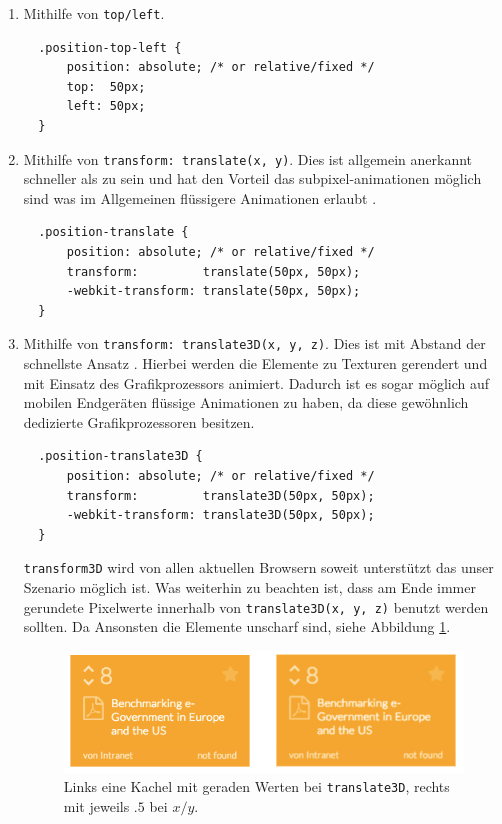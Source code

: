 \documentclass[12pt,twoside]{book}
\begin{document}
\begin{enumerate}
  \item Mithilfe von \texttt{top/left}.\\
  \begin{verbatim}
  .position-top-left {
      position: absolute; /* or relative/fixed */
      top:  50px;
      left: 50px;
  }
  \end{verbatim}
  \item Mithilfe von \texttt{transform: translate(x, y)}. Dies ist allgemein anerkannt schneller als zu sein und hat den Vorteil das subpixel-animationen möglich sind was im Allgemeinen flüssigere Animationen erlaubt \cite{translate}. \\
  \begin{verbatim}
  .position-translate {
      position: absolute; /* or relative/fixed */
      transform:         translate(50px, 50px);
      -webkit-transform: translate(50px, 50px);
  }
  \end{verbatim}
  \item Mithilfe von \texttt{transform: translate3D(x, y, z)}. Dies ist mit Abstand der schnellste Ansatz \cite{translate3dvstranslate}. Hierbei werden die Elemente zu Texturen gerendert und mit Einsatz des Grafikprozessors animiert. Dadurch ist es sogar möglich auf mobilen Endgeräten flüssige Animationen zu haben, da diese gewöhnlich dedizierte Grafikprozessoren besitzen.
  \begin{verbatim}
  .position-translate3D {
      position: absolute; /* or relative/fixed */
      transform:         translate3D(50px, 50px);
      -webkit-transform: translate3D(50px, 50px);
  }
  \end{verbatim}
  \texttt{transform3D} wird von allen aktuellen Browsern soweit unterstützt das unser Szenario möglich ist\cite{transform3d}. Was weiterhin zu beachten ist, dass am Ende immer gerundete Pixelwerte innerhalb von \texttt{translate3D(x, y, z)} benutzt werden sollten. Da Ansonsten die Elemente unscharf sind, siehe Abbildung \ref{fig:blurry}.

\begin{figure}[htbp]
	\centering
	\includegraphics[width=1.0\textwidth]{images/blurry_tiles.png}
	\caption{Links eine Kachel mit geraden Werten bei \texttt{translate3D}, rechts mit jeweils $.5$ bei $x/y$.}
	\label{fig:blurry}
\end{figure}

\end{enumerate}
\end{document}
